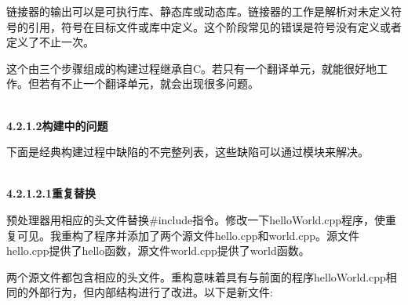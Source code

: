 链接器的输出可以是可执行库、静态库或动态库。链接器的工作是解析对未定义符号的引用，符号在目标文件或库中定义。这个阶段常见的错误是符号没有定义或者定义了不止一次。

这个由三个步骤组成的构建过程继承自C。若只有一个翻译单元，就能很好地工作。但若有不止一个翻译单元，就会出现很多问题。

\hspace*{\fill} \\ %
\noindent
\textbf{4.2.1.2\hspace{0.2cm}构建中的问题}

下面是经典构建过程中缺陷的不完整列表，这些缺陷可以通过模块来解决。

\hspace*{\fill} \\ %
\noindent
\textbf{4.2.1.2.1\hspace{0.2cm}重复替换}

预处理器用相应的头文件替换\#include指令。修改一下helloWorld.cpp程序，使重复可见。我重构了程序并添加了两个源文件hello.cpp和world.cpp。源文件hello.cpp提供了hello函数，源文件world.cpp提供了world函数。

两个源文件都包含相应的头文件。重构意味着具有与前面的程序helloWorld.cpp相同的外部行为，但内部结构进行了改进。以下是新文件:

